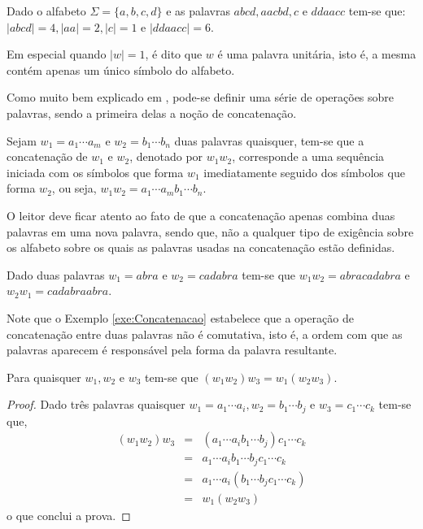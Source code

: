 \begin{example}
	Dado o alfabeto $\Sigma = \{a, b, c, d\}$ e as palavras $abcd, aacbd, c$ e $ddaacc$ tem-se que: $|abcd| = 4, |aa| = 2, |c| = 1$ e $|ddaacc| = 6$.
\end{example}

\begin{remark}
	Em especial quando $|w| = 1$, é dito que $w$ é uma palavra unitária, isto é, a mesma contém apenas um único símbolo do alfabeto.
\end{remark}

Como muito bem explicado em \cite{benjaLivro2010, hopcroft2008, linz2006}, pode-se definir uma série de operações sobre palavras, sendo a primeira delas  a noção de concatenação.

\begin{definition}\label{def:Concatenacao}
	Sejam $w_1 = a_1\cdots a_m$ e $w_2 = b_1\cdots b_n$ duas palavras quaisquer, tem-se que a concatenação de $w_1$ e $w_2$, denotado por $w_1w_2$, corresponde a uma sequência iniciada com os símbolos que forma $w_1$ imediatamente seguido dos símbolos que forma $w_2$, ou seja, $w_1w_2 = a_1\cdots a_mb_1\cdots b_n$.
\end{definition}

\begin{remark}
	O leitor deve ficar atento ao fato de que a concatenação apenas combina duas palavras em uma nova palavra, sendo que, não a qualquer tipo de exigência sobre os alfabeto sobre os quais as palavras usadas na concatenação estão definidas.
\end{remark}

\begin{example}\label{exe:Concatenacao}
	Dado duas palavras $w_1 = abra$ e $w_2 = cadabra$ tem-se que $w_1w_2 = abracadabra$ e $w_2w_1 = cadabraabra$.
\end{example}

Note que o Exemplo \ref{exe:Concatenacao} estabelece que a operação de concatenação entre duas palavras não é comutativa, isto é, a ordem com que as palavras aparecem é responsável pela forma da palavra resultante.

\begin{theorem}\label{teo:AssociatividaeConcatenacao}
	Para quaisquer $w_1, w_2$ e $w_3$ tem-se que $(w_1w_2)w_3 = w_1(w_2w_3)$.
\end{theorem}

\begin{proof}
	Dado três palavras quaisquer $w_1 = a_1\cdots a_i, w_2 = b_1\cdots b_j$ e $w_3 = c_1\cdots c_k$ tem-se que,
	\begin{eqnarray*}
		(w_1w_2)w_3 & = & (a_1\cdots a_ib_1\cdots b_j)c_1\cdots c_k\\
		& = & a_1\cdots a_ib_1\cdots b_jc_1\cdots c_k\\
		& = & a_1\cdots a_i(b_1\cdots b_jc_1\cdots c_k)\\
		& = & w_1(w_2w_3)
	\end{eqnarray*}
	o que conclui a prova.
\end{proof}

